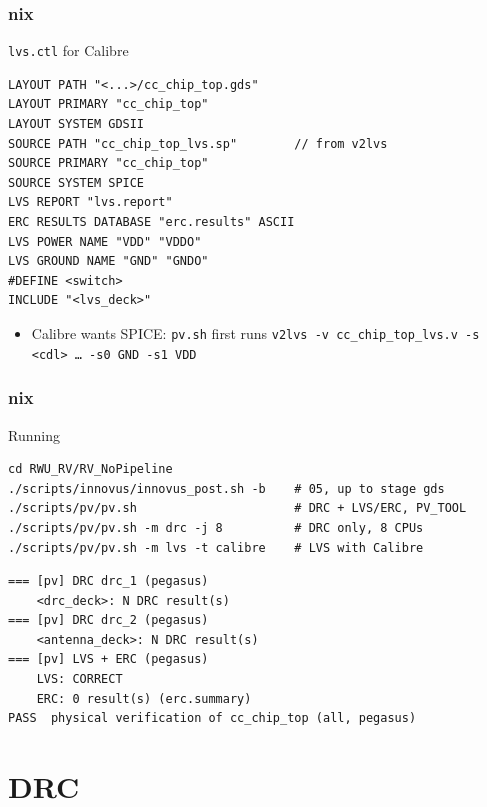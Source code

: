 \documentclass{beamer}
\newcommand{\astitle}{nix}
\newcommand{\assubtitle}{nix}
\newcommand{\cmd}[1]{\texttt{#1}}
\begin{document}
\renewcommand{\assubtitle}{\texttt{lvs.ctl} for Calibre}
\begin{frame}[fragile]
\frametitle{\astitle}
\begin{block}{\assubtitle}
\begin{lstlisting}[style=sh]
LAYOUT PATH "<...>/cc_chip_top.gds"
LAYOUT PRIMARY "cc_chip_top"
LAYOUT SYSTEM GDSII
SOURCE PATH "cc_chip_top_lvs.sp"        // from v2lvs
SOURCE PRIMARY "cc_chip_top"
SOURCE SYSTEM SPICE
LVS REPORT "lvs.report"
ERC RESULTS DATABASE "erc.results" ASCII
LVS POWER NAME "VDD" "VDDO"
LVS GROUND NAME "GND" "GNDO"
#DEFINE <switch>
INCLUDE "<lvs_deck>"
\end{lstlisting}
  \begin{itemize}
    \item Calibre wants SPICE: \cmd{pv.sh} first runs
      \cmd{v2lvs -v cc\_chip\_top\_lvs.v -s <cdl> \dots\ -s0 GND -s1 VDD}
  \end{itemize}
\end{block}
\end{frame}

\renewcommand{\assubtitle}{Running}
\begin{frame}[fragile]
\frametitle{\astitle}
\begin{block}{\assubtitle}
\begin{lstlisting}[style=sh]
cd RWU_RV/RV_NoPipeline
./scripts/innovus/innovus_post.sh -b    # 05, up to stage gds
./scripts/pv/pv.sh                      # DRC + LVS/ERC, PV_TOOL
./scripts/pv/pv.sh -m drc -j 8          # DRC only, 8 CPUs
./scripts/pv/pv.sh -m lvs -t calibre    # LVS with Calibre
\end{lstlisting}
\begin{lstlisting}[style=out]
=== [pv] DRC drc_1 (pegasus)
    <drc_deck>: N DRC result(s)
=== [pv] DRC drc_2 (pegasus)
    <antenna_deck>: N DRC result(s)
=== [pv] LVS + ERC (pegasus)
    LVS: CORRECT
    ERC: 0 result(s) (erc.summary)
PASS  physical verification of cc_chip_top (all, pegasus)
\end{lstlisting}
\end{block}
\end{frame}

\section{DRC}
\renewcommand{\astitle}{DRC}
\end{document}
